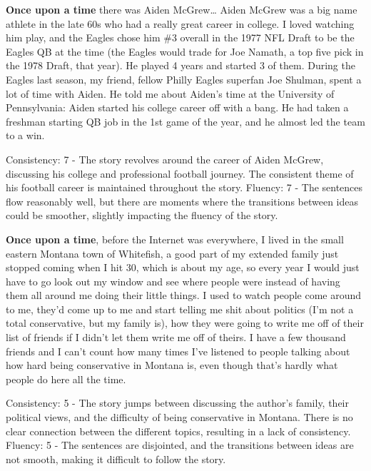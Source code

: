 \documentclass{article}
\begin{document}
\textbf{Once upon a time} there was Aiden McGrew… Aiden McGrew was a big name athlete in the late 60s who had a really great career in college. I loved watching him play, and the Eagles chose him \#3 overall in the 1977 NFL Draft to be the Eagles QB at the time (the Eagles would trade for Joe Namath, a top five pick in the 1978 Draft, that year). He played 4 years and started 3 of them. During the Eagles last season, my friend, fellow Philly Eagles superfan Joe Shulman, spent a lot of time with Aiden. He told me about Aiden's time at the University of Pennsylvania: Aiden started his college career off with a bang. He had taken a freshman starting QB job in the 1st game of the year, and he almost led the team to a win.

Consistency: 7 - The story revolves around the career of Aiden McGrew, discussing his college and professional football journey. The consistent theme of his football career is maintained throughout the story.
Fluency: 7 - The sentences flow reasonably well, but there are moments where the transitions between ideas could be smoother, slightly impacting the fluency of the story.

\textbf{Once upon a time}, before the Internet was everywhere, I lived in the small eastern Montana town of Whitefish, a good part of my extended family just stopped coming when I hit 30, which is about my age, so every year I would just have to go look out my window and see where people were instead of having them all around me doing their little things. I used to watch people come around to me, they'd come up to me and start telling me shit about politics (I'm not a total conservative, but my family is), how they were going to write me off of their list of friends if I didn't let them write me off of theirs. I have a few thousand friends and I can't count how many times I've listened to people talking about how hard being conservative in Montana is, even though that's hardly what people do here all the time.

Consistency: 5 - The story jumps between discussing the author's family, their political views, and the difficulty of being conservative in Montana. There is no clear connection between the different topics, resulting in a lack of consistency.
Fluency: 5 - The sentences are disjointed, and the transitions between ideas are not smooth, making it difficult to follow the story.
\end{document}

